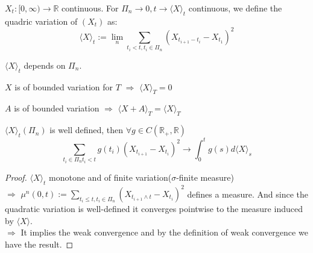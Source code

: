 \begin{definition}
	$X_t: [0, \infty) \rightarrow \mathbb{R}$ continuous. For $\Pi_n \rightarrow 0, t \rightarrow \langle X \rangle_t$ continuous, we define the quadric variation of $(X_t)$ as:
	\begin{equation*}
		\langle X \rangle_t := \lim_n \sum_{t_i < t, t_i \in \Pi_n} (X_{t_{i+1} - t_i} - X_{t_1})^2 
	\end{equation*}
\end{definition}
\begin{remark}
$\langle X \rangle_t$ depends on $\Pi_n$.	
\end{remark}

\begin{lemma}
	$X$ is of bounded variation for $T$ $\Rightarrow$ $\langle X \rangle_T = 0$ 
\end{lemma}

\begin{corollary}
	$A$ is of bounded variation $\Rightarrow$ $\langle X + A \rangle_T = \langle X \rangle_T$
\end{corollary}

\begin{lemma}
$\langle X \rangle_t(\Pi_n)$	 is well defined, then $\forall g \in C(\mathbb{R}_+, \mathbb{R})$
\begin{equation*}
	\sum_{t_i \in \Pi_n t_i < t} g(t_i) (X_{t_{i+1}} - X_{t_i})^2 \rightarrow \int_0^t g(s)d\langle X \rangle_s
\end{equation*}
\end{lemma}
\begin{proof}
	$\langle X \rangle_t$ monotone and of finite variation($\sigma$-finite measure)\\
	$\Rightarrow$ $\mu^n(0, t) := \sum_{t_i \leq t, t_i \in \Pi_n} (X_{t_{i+1}\wedge t} - X_{t_i})^2$  defines a measure. And since the quadratic variation is well-defined it converges pointwise to the measure induced by $\langle X \rangle$.\\
	$\Rightarrow$ It implies the weak convergence and by the definition of weak convergence we have the result.
\end{proof}

